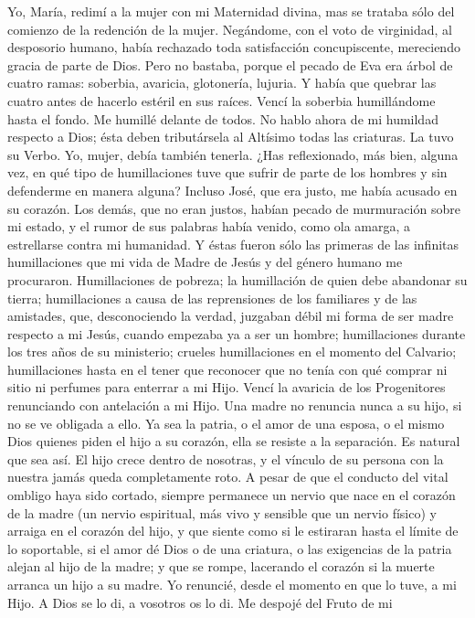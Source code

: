 \documentclass[12pt]{book} %
\begin{document}
Yo, María, redimí a la mujer con mi Maternidad divina, mas se trataba sólo del comienzo de la redención de la mujer. Negándome, con el voto de virginidad, al desposorio humano, había rechazado toda satisfacción concupiscente, mereciendo gracia de parte de Dios. Pero no bastaba, porque el pecado de Eva era árbol de cuatro ramas: soberbia, avaricia, glotonería, lujuria. Y había que quebrar las cuatro antes de hacerlo estéril en sus raíces. 
Vencí la soberbia humillándome hasta el fondo. 
Me humillé delante de todos. No hablo ahora de mi humildad respecto a Dios; ésta deben tributársela al Altísimo todas las criaturas. La tuvo su Verbo. Yo, mujer, debía también tenerla. ¿Has reflexionado, más bien, alguna vez, en qué tipo de humillaciones tuve que sufrir de parte de los hombres y sin defenderme en manera alguna? Incluso José, que era justo, me había acusado en su corazón. Los demás, que no eran justos, habían pecado de murmuración sobre mi estado, y el rumor de sus palabras había venido, como ola amarga, a estrellarse contra mi humanidad. 
Y éstas fueron sólo las primeras de las infinitas humillaciones que mi vida de Madre de Jesús y del género humano me procuraron. Humillaciones de pobreza; la humillación de quien debe abandonar su tierra; humillaciones a causa de las reprensiones de los familiares y de las amistades, que, desconociendo la verdad, juzgaban débil mi forma de ser madre respecto a mi Jesús, cuando empezaba ya a ser un hombre; humillaciones durante los tres años de su ministerio; crueles humillaciones en el momento del Calvario; humillaciones hasta en el tener que reconocer que no tenía con qué comprar ni sitio ni perfumes para enterrar a mi Hijo. 
Vencí la avaricia de los Progenitores renunciando con antelación a mi Hijo. 
Una madre no renuncia nunca a su hijo, si no se ve obligada a ello. Ya sea la patria, o el amor de una esposa, o el mismo Dios quienes piden el hijo a su corazón, ella se resiste a la separación. Es natural que sea así. El hijo crece dentro de nosotras, y el vínculo de su persona con la nuestra jamás queda completamente roto. A pesar de que el conducto del vital ombligo haya sido cortado, siempre permanece un nervio que nace en el corazón de la madre (un nervio espiritual, más vivo y sensible que un nervio físico) y arraiga en el corazón del hijo, y que siente como si le estiraran hasta el límite de lo soportable, si el amor dé Dios o de una criatura, o las exigencias de la patria alejan al hijo de la madre; y que se rompe, lacerando el corazón si la muerte arranca un hijo a su madre.            
Yo renuncié, desde el momento en que lo tuve, a mi Hijo. A Dios se lo di, a vosotros os lo di. Me despojé del Fruto de mi 
\end{document}
